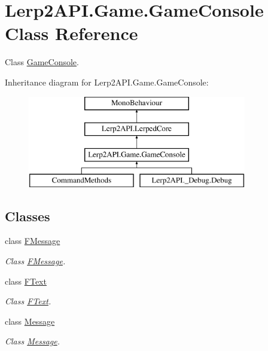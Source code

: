 \hypertarget{class_lerp2_a_p_i_1_1_game_1_1_game_console}{}\section{Lerp2\+A\+P\+I.\+Game.\+Game\+Console Class Reference}
\label{class_lerp2_a_p_i_1_1_game_1_1_game_console}


Class \hyperlink{class_lerp2_a_p_i_1_1_game_1_1_game_console}{Game\+Console}.  


Inheritance diagram for Lerp2\+A\+P\+I.\+Game.\+Game\+Console\+:\begin{figure}[H]
\begin{center}
\leavevmode
\includegraphics[height=4.000000cm]{class_lerp2_a_p_i_1_1_game_1_1_game_console}
\end{center}
\end{figure}
\subsection*{Classes}
\begin{DoxyCompactItemize}
\item 
class \hyperlink{class_lerp2_a_p_i_1_1_game_1_1_game_console_1_1_f_message}{F\+Message}
\begin{DoxyCompactList}\small\item\em Class \hyperlink{class_lerp2_a_p_i_1_1_game_1_1_game_console_1_1_f_message}{F\+Message}. \end{DoxyCompactList}\item 
class \hyperlink{class_lerp2_a_p_i_1_1_game_1_1_game_console_1_1_f_text}{F\+Text}
\begin{DoxyCompactList}\small\item\em Class \hyperlink{class_lerp2_a_p_i_1_1_game_1_1_game_console_1_1_f_text}{F\+Text}. \end{DoxyCompactList}\item 
class \hyperlink{class_lerp2_a_p_i_1_1_game_1_1_game_console_1_1_message}{Message}
\begin{DoxyCompactList}\small\item\em Class \hyperlink{class_lerp2_a_p_i_1_1_game_1_1_game_console_1_1_message}{Message}. \end{DoxyCompactList}\end{DoxyCompactItemize}
